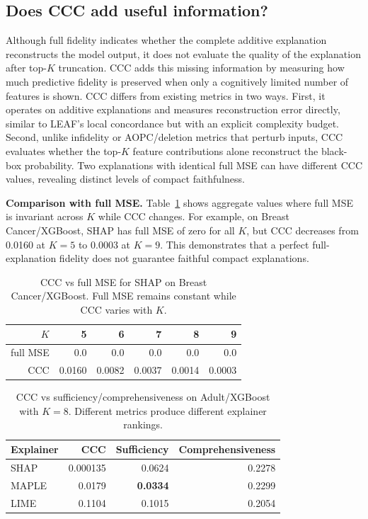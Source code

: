 \documentclass[sigconf,nonacm]{acmart}
\begin{document}
\subsection{Does CCC add useful information?}
Although full fidelity indicates whether the complete additive explanation
reconstructs the model output, it does not evaluate the quality of the explanation
after top-$K$ truncation. CCC adds this missing information by measuring how much
predictive fidelity is preserved when only a cognitively limited number of features
is shown. CCC differs from existing metrics in two ways. First, it operates on
additive explanations and measures reconstruction error directly, similar to LEAF's
local concordance but with an explicit complexity budget. Second, unlike infidelity
or AOPC/deletion metrics that perturb inputs, CCC evaluates whether the top-$K$
feature contributions alone reconstruct the black-box probability. Two explanations
with identical full MSE can have different CCC values, revealing distinct levels of
compact faithfulness.

\textbf{Comparison with full MSE.} Table~\ref{tab:ccc-vs-full} shows aggregate values
where full MSE is invariant across $K$ while CCC changes. For example, on
Breast Cancer/XGBoost, SHAP has full MSE of zero for all $K$, but CCC decreases
from 0.0160 at $K=5$ to 0.0003 at $K=9$. This demonstrates that a perfect
full-explanation fidelity does not guarantee faithful compact explanations.

\begin{table}[t]
  \caption{CCC vs full MSE for SHAP on Breast Cancer/XGBoost. Full MSE remains
  constant while CCC varies with $K$.}
  \label{tab:ccc-vs-full}
  \centering
  \begin{tabular}{rrrrrr}
    \toprule
    $K$ & 5 & 6 & 7 & 8 & 9 \\
    \midrule
    full MSE & 0.0 & 0.0 & 0.0 & 0.0 & 0.0 \\
    CCC & 0.0160 & 0.0082 & 0.0037 & 0.0014 & 0.0003 \\
    \bottomrule
  \end{tabular}
\end{table}

\begin{table}[t]
  \caption{CCC vs sufficiency/comprehensiveness on Adult/XGBoost with $K=8$.
  Different metrics produce different explainer rankings.}
  \label{tab:ccc-vs-perturb}
  \centering
  \begin{tabular}{lrrr}
    \toprule
    Explainer & CCC & Sufficiency & Comprehensiveness \\
    \midrule
    SHAP  & 0.000135 & 0.0624 & 0.2278 \\
    MAPLE & 0.0179 & \textbf{0.0334} & 0.2299 \\
    LIME  & 0.1104 & 0.1015 & 0.2054 \\
    \bottomrule
  \end{tabular}
\end{table}
\end{document}
